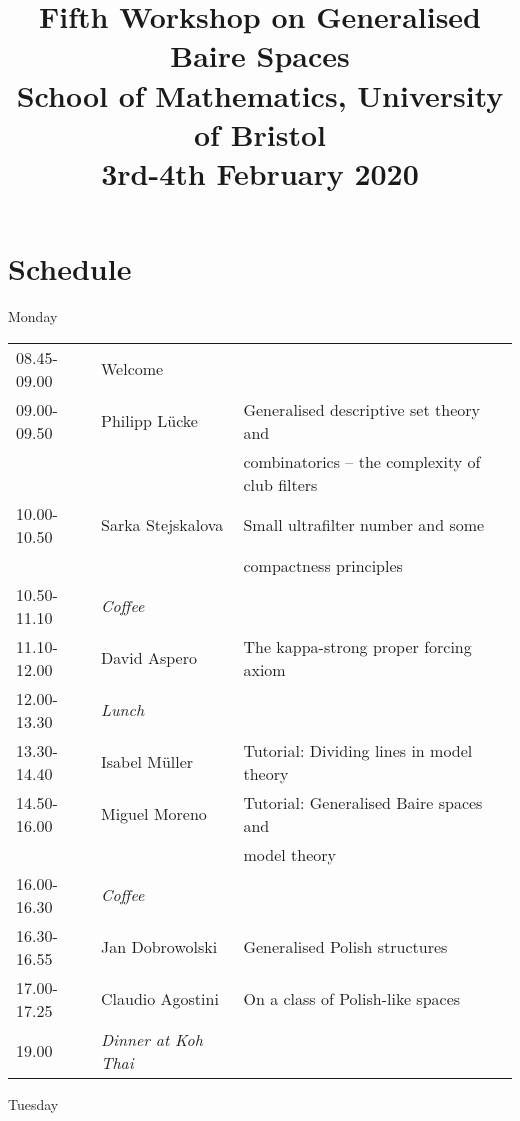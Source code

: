\documentclass[a4paper]{amsart}
\title[Workshop on generalised Baire spaces]{Fifth Workshop on Generalised Baire Spaces \\ 
School of Mathematics, University of Bristol \\ 
3rd-4th February 2020}
\theoremstyle{remark}
\begin{document}

\maketitle

\section*{Schedule} 

\begin{center} 
Monday 
\end{center} 

\bigskip 

\begin{tabular} 
{ l | l | l}
08.45-09.00  & Welcome & \\ 
09.00-09.50  & Philipp L\" ucke & Generalised descriptive set theory and \\ 
& & combinatorics -- the complexity of club filters \\ 
10.00-10.50 & Sarka Stejskalova & Small ultrafilter number and some \\
& & compactness principles \\ 
10.50-11.10  & \emph{Coffee} & \\ 
11.10-12.00  & David Aspero & The kappa-strong proper forcing axiom \\ 
12.00-13.30  & \emph{Lunch} & \\ 
13.30-14.40  & Isabel M\" uller & Tutorial: Dividing lines in model theory \\ 
14.50-16.00  & Miguel Moreno & Tutorial: Generalised Baire spaces and \\ 
 & & model theory \\ 
16.00-16.30  & \emph{Coffee} &  \\ 
16.30-16.55  & Jan Dobrowolski & Generalised Polish structures \\ 
17.00-17.25  & Claudio Agostini & On a class of Polish-like spaces \\ 
19.00  & \emph{Dinner at Koh Thai} & \\ 
\end{tabular} 


\bigskip 
\bigskip 

\begin{center} 
Tuesday
\end{center} 

\bigskip 
\end{document}
